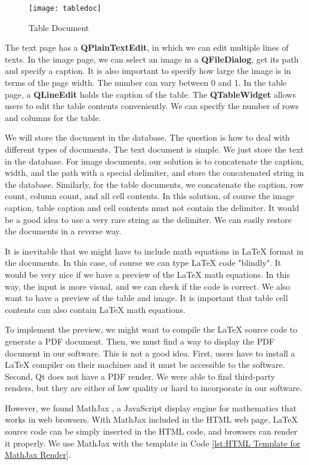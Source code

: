 \begin{figure}[htbp]
\centering
\texttt{[image: tabledoc]}
\caption{Table Document\label{fig:Table Document}}
\end{figure}

The text page has a \textbf{QPlainTextEdit}, in which we can edit multiple lines of texts. In the image page, we can select an image in a \textbf{QFileDialog}, get its path and specify a caption. It is also important to specify how large the image is in terms of the page width. The number can vary between 0 and 1. In the table page, a \textbf{QLineEdit} holds the caption of the table. The \textbf{QTableWidget} allows users to edit the table contents conveniently. We can specify the number of rows and columns for the table.

We will store the document in the database. The question is how to deal with different types of documents. The text document is simple. We just store the text in the database. For image documents, our solution is to concatenate the caption, width, and the path with a special delimiter, and store the concatenated string in the database. Similarly, for the table documents, we concatenate the caption, row count, column count, and all cell contents. In this solution, of course the image caption, table caption and cell contents must not contain the delimiter. It would be a good idea to use a very rare string as the delimiter. We can easily restore the documents in a reverse way.

It is inevitable that we might have to include math equations in LaTeX format in the documents. In this case, of course we can type LaTeX code "blindly". It would be very nice if we have a preview of the LaTeX math equations. In this way, the input is more visual, and we can check if the code is correct. We also want to have a preview of the table and image. It is important that table cell contents can also contain LaTeX math equations.

To implement the preview, we might want to compile the LaTeX source code to generate a PDF document. Then, we must find a way to display the PDF document in our software. This is not a good idea. First, users have to install a LaTeX compiler on their machines and it must be accessible to the software. Second, Qt does not have a PDF render. We were able to find third-party renders, but they are either of low quality or hard to incorporate in our software.

However, we found MathJax \cite{mathjax}, a JavaScript display engine for mathematics that works in web browsers. With MathJax included in the HTML web page, LaTeX source code can be simply inserted in the HTML code, and browsers can render it properly. We use MathJax with the template in Code \ref{lst:HTML Template for MathJax Render}.

